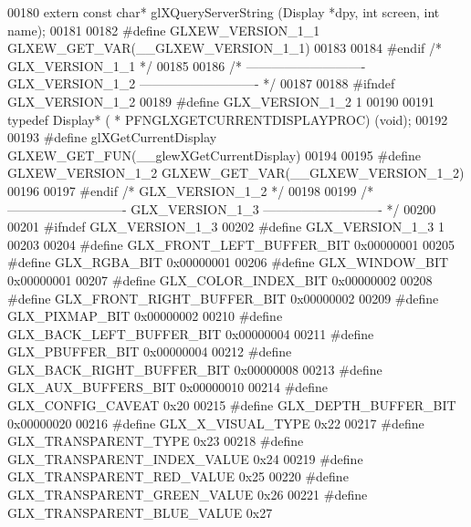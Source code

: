 \begin{DoxyCode}
00180 \textcolor{keyword}{extern} \textcolor{keyword}{const} \textcolor{keywordtype}{char}* glXQueryServerString (Display *dpy, \textcolor{keywordtype}{int} screen, \textcolor{keywordtype}{int} name);
00181 
00182 \textcolor{preprocessor}{#define GLXEW\_VERSION\_1\_1 GLXEW\_GET\_VAR(\_\_GLXEW\_VERSION\_1\_1)}
00183 
00184 \textcolor{preprocessor}{#endif }\textcolor{comment}{/* GLX\_VERSION\_1\_1 */}\textcolor{preprocessor}{}
00185 
00186 \textcolor{comment}{/* ---------------------------- GLX\_VERSION\_1\_2 ---------------------------- */}
00187 
00188 \textcolor{preprocessor}{#ifndef GLX\_VERSION\_1\_2}
00189 \textcolor{preprocessor}{#define GLX\_VERSION\_1\_2 1}
00190 
00191 \textcolor{keyword}{typedef} Display* ( * PFNGLXGETCURRENTDISPLAYPROC) (void);
00192 
00193 \textcolor{preprocessor}{#define glXGetCurrentDisplay GLXEW\_GET\_FUN(\_\_glewXGetCurrentDisplay)}
00194 
00195 \textcolor{preprocessor}{#define GLXEW\_VERSION\_1\_2 GLXEW\_GET\_VAR(\_\_GLXEW\_VERSION\_1\_2)}
00196 
00197 \textcolor{preprocessor}{#endif }\textcolor{comment}{/* GLX\_VERSION\_1\_2 */}\textcolor{preprocessor}{}
00198 
00199 \textcolor{comment}{/* ---------------------------- GLX\_VERSION\_1\_3 ---------------------------- */}
00200 
00201 \textcolor{preprocessor}{#ifndef GLX\_VERSION\_1\_3}
00202 \textcolor{preprocessor}{#define GLX\_VERSION\_1\_3 1}
00203 
00204 \textcolor{preprocessor}{#define GLX\_FRONT\_LEFT\_BUFFER\_BIT 0x00000001}
00205 \textcolor{preprocessor}{#define GLX\_RGBA\_BIT 0x00000001}
00206 \textcolor{preprocessor}{#define GLX\_WINDOW\_BIT 0x00000001}
00207 \textcolor{preprocessor}{#define GLX\_COLOR\_INDEX\_BIT 0x00000002}
00208 \textcolor{preprocessor}{#define GLX\_FRONT\_RIGHT\_BUFFER\_BIT 0x00000002}
00209 \textcolor{preprocessor}{#define GLX\_PIXMAP\_BIT 0x00000002}
00210 \textcolor{preprocessor}{#define GLX\_BACK\_LEFT\_BUFFER\_BIT 0x00000004}
00211 \textcolor{preprocessor}{#define GLX\_PBUFFER\_BIT 0x00000004}
00212 \textcolor{preprocessor}{#define GLX\_BACK\_RIGHT\_BUFFER\_BIT 0x00000008}
00213 \textcolor{preprocessor}{#define GLX\_AUX\_BUFFERS\_BIT 0x00000010}
00214 \textcolor{preprocessor}{#define GLX\_CONFIG\_CAVEAT 0x20}
00215 \textcolor{preprocessor}{#define GLX\_DEPTH\_BUFFER\_BIT 0x00000020}
00216 \textcolor{preprocessor}{#define GLX\_X\_VISUAL\_TYPE 0x22}
00217 \textcolor{preprocessor}{#define GLX\_TRANSPARENT\_TYPE 0x23}
00218 \textcolor{preprocessor}{#define GLX\_TRANSPARENT\_INDEX\_VALUE 0x24}
00219 \textcolor{preprocessor}{#define GLX\_TRANSPARENT\_RED\_VALUE 0x25}
00220 \textcolor{preprocessor}{#define GLX\_TRANSPARENT\_GREEN\_VALUE 0x26}
00221 \textcolor{preprocessor}{#define GLX\_TRANSPARENT\_BLUE\_VALUE 0x27}

\end{DoxyCode}
